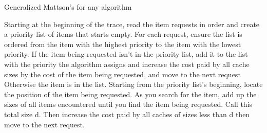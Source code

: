 \begin{algorithm}
    \caption{Generalized Mattson's for any algorithm}\label{euclid}
        \begin{algorithmic}[1]
\State Starting at the beginning of the trace, read the item requests in order and create a priority list of items that starts empty. 
\State For each request, ensure the list is ordered from the item with the highest priority to the item with the lowest priority. 
\State If the item being requested isn't in the priority list, add it to the list with the priority the algorithm assigns and increase the cost paid by all cache sizes by the cost of the item being requested, and move to the next request 
\State Otherwise the item is in the list. Starting from the priority list's beginning, locate the position of the item being requested. As you search for the item, add up the sizes of all items encountered until you find the item being requested. Call this total size d. Then increase the cost paid by all caches of sizes less than d then move to the next request.
\end{algorithmic}
\end{algorithm}